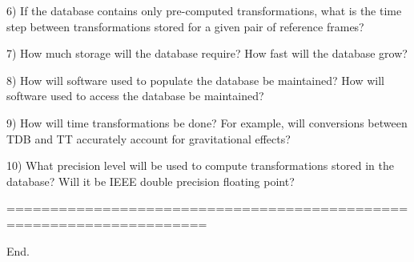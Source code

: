 

6) If the database contains only pre-computed transformations, what is the time step between transformations stored for a given pair of reference frames?

 

 

7) How much storage will the database require? How fast will the database grow?

 

 

8) How will software used to populate the database be maintained? How will software used to access the database be maintained?

 

 

9) How will time transformations be done? For example, will conversions between TDB and TT accurately account for gravitational effects?

 

 

10) What precision level will be used to compute transformations stored in the database? Will it be IEEE double precision floating point?

 

=====================================================================

End.